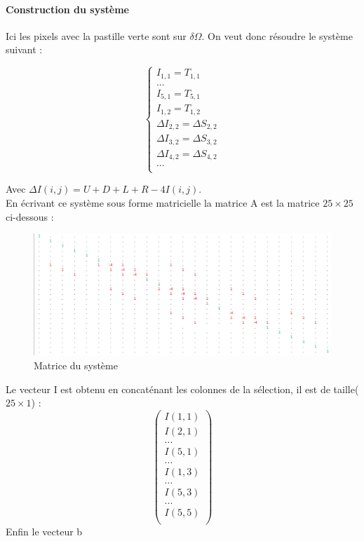 \paragraph{Construction du système}
Ici les pixels avec la pastille verte sont sur $\delta \Omega$. On veut donc résoudre le système suivant :  
\begin{center}
\begin{equation}
\left\{
\begin{aligned}
I_{1,1} = T_{1,1}\\
...\\
I_{5,1} = T_{5,1}\\
I_{1,2} = T_{1,2}\\
\Delta I_{2,2} = \Delta S_{2,2}\\
\Delta I_{3,2} = \Delta S_{3,2}\\
\Delta I_{4,2} = \Delta S_{4,2}\\
...\\
\end{aligned}
\right.
\end{equation}
\end{center}
Avec $\Delta I(i,j) = U+D+L+R-4I(i,j)$.\\
En écrivant ce système sous forme matricielle la matrice A est la matrice $25\times 25$ ci-dessous :  

\begin{figure}[!h]
\includegraphics[scale=0.5]{Images/matrice.png}
\caption{Matrice du système}
\end{figure}

Le vecteur I est obtenu en concaténant les colonnes de la sélection, il est de taille($25\times 1$) : 
\begin{equation}
\begin{pmatrix}
I(1,1)\\
I(2,1)\\
...\\
I(5,1)\\
...\\
I(1,3)\\
...\\
I(5,3)\\
...\\
I(5,5)\\
\end{pmatrix}
\end{equation}
Enfin le vecteur b 

